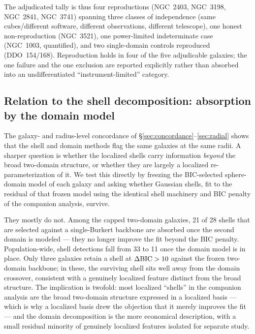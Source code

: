 \documentclass[twocolumn]{aastex701}
\newcommand{\dbic}{\Delta{\rm BIC}}
\begin{document}
The adjudicated tally is thus four reproductions (NGC~2403, NGC~3198,
NGC~2841, NGC~3741) spanning three classes of independence (same
cubes/different software, different observations, different telescope), one
honest non-reproduction (NGC~3521), one power-limited indeterminate case
(NGC~1003, quantified), and two single-domain controls reproduced
(DDO~154/168). Reproduction holds in four of the five adjudicable galaxies;
the one failure and the one exclusion are reported explicitly rather than
absorbed into an undifferentiated ``instrument-limited'' category.

\subsection{Relation to the shell decomposition: absorption by the domain model} \label{sec:absorption}

The galaxy- and radius-level concordance of \S\ref{sec:concordance}--\ref{sec:radial}
shows that the shell and domain methods flag the same galaxies at the same radii.
A sharper question is whether the localized shells carry information \emph{beyond}
the broad two-domain structure, or whether they are largely a localized
re-parameterization of it. We test this directly by freezing the BIC-selected
sphere-domain model of each galaxy and asking whether Gaussian shells, fit to the
residual of that frozen model using the identical shell machinery and BIC penalty
of the companion analysis, survive.

They mostly do not. Among the capped two-domain galaxies, 21 of 28 shells that
are selected against a single-Burkert backbone are absorbed once the second
domain is modeled --- they no longer improve the fit beyond the BIC penalty.
Population-wide, shell detections fall from 33 to 11 once the domain model is in
place. Only three galaxies retain a shell at $\dbic > 10$ against the frozen
two-domain backbone; in these, the surviving shell sits well away from the domain
crossover, consistent with a genuinely localized feature distinct from the broad
structure. The implication is twofold: most localized ``shells'' in the companion
analysis are the broad two-domain structure expressed in a localized basis ---
which is why a localized basis drew the objection that it merely improves the
fit --- and the domain decomposition is the more economical description, with a
small residual minority of genuinely localized features isolated for separate
study.
\end{document}
